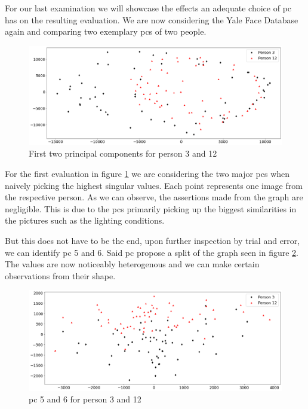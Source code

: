 For our last examination we will showcase the effects an adequate choice of \acrlong{pc} has on the resulting evaluation.
We are now considering the Yale Face Database again and comparing two exemplary \glspl{pc} of two people.

\begin{center}
    \begin{figure}[h]
      \centering
      \includegraphics[width=0.9\linewidth]{external_content/media/choice_of_pc/p3_12-pc1_2-centered.png}
      \captionsetup{justification=centering}
      \caption{First two principal components for person 3 and 12}
      \label{fig:pcIandII}
    \end{figure}
\end{center}

\vspace{-8mm}
For the first evaluation in figure \ref{fig:pcIandII} we are considering the two major \glspl{pc} when naively picking the highest singular values.
Each point represents one image from the respective person.
As we can observe, the assertions made from the graph are negligible.
This is due to the \glspl{pc} primarily picking up the biggest similarities in the pictures such as the lighting conditions.

But this does not have to be the end, upon further inspection by trial and error, we can identify \gls{pc} 5 and 6.
Said \gls{pc} propose a split of the graph seen in figure \ref{fig:pcVandVI}.
The values are now noticeably heterogenous and we can make certain observations from their shape.

\begin{center}
    \begin{figure}[h]
      \centering
      \includegraphics[width=0.9\linewidth]{external_content/media/choice_of_pc/p3_12-pc5_6-centered.png}
      \captionsetup{justification=centering}
      \caption{\gls{pc} 5 and 6 for person 3 and 12}
      \label{fig:pcVandVI}
    \end{figure}
\end{center}

